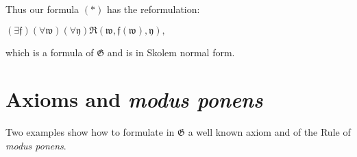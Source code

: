 \documentclass[12pt]{article}
\begin{document}
Thus our formula $(\ast)$ has the reformulation:

\begin{center}
$(\exists \mathfrak{f}) (\forall \mathfrak{w}) (\forall \mathfrak{y}) \mathfrak{R} (\mathfrak{w}, \mathfrak{f} (\mathfrak{w}), \mathfrak{y}),$
\end{center}

which is a formula of $\mathfrak{G}$ and is in Skolem normal form. 

\section{Axioms and \emph{modus ponens}}\normalsize

Two examples show how to formulate in $\mathfrak{G}$ a well known axiom and of the Rule of \emph{modus ponens}.
\end{document}
